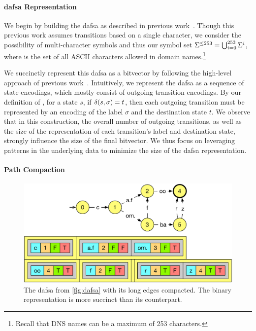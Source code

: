 \paragraph{\ac{dafsa} Representation}

We begin by building the \ac{dafsa} as described in previous
work~\cite{daciuk2000incremental}. Though this previous work assumes transitions
based on a single character, we consider the possibility of multi-character
symbols and thus our symbol set $\Sigma^{\le 253} = \bigcup_{i=0}^{253}
\Sigma^i$, where \symbols is the set of all ASCII characters allowed in domain
names.\footnote{Recall that DNS names can be a maximum of 253 characters.}

We succinctly represent this \ac{dafsa} as a bitvector by following the
high-level approach of previous work~\cite{daciuk2012smaller}. Intuitively, we
represent the \ac{dafsa} as a sequence of state encodings, which mostly consist
of outgoing transition encodings. By our definition of \transfunc, for a state
$s$, if $\delta(s, \sigma) = t$, then each outgoing transition must be
represented by an encoding of the label $\sigma$ and the destination state $t$.
We observe that in this construction, the overall number of outgoing
transitions, as well as the size of the representation of each transition's
label and destination state, strongly influence the size of the final bitvector.
We thus focus on leveraging patterns in the underlying data to minimize the size
of the \ac{dafsa} representation.

\paragraph{Path Compaction}

\begin{figure}
  \centering
  \includegraphics[width=\linewidth]{fig/dafsa_compact}
  \caption{The \ac{dafsa} from \autoref{fig:dafsa} with its long edges
  compacted. The binary representation is more succinct than its counterpart.}
  \label{fig:dafsa_compact}
\end{figure}

